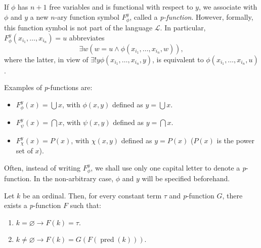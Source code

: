 \begin{definition}
    \label{def:pFunc}
    \leanok
    If $\phi$ has $n+1$ free variables and is functional with respect to $y$, 
    we associate with $\phi$ and $y$ a new $n$-ary function symbol $F_\phi^y$, 
    called a \textit{p-function}. 
    However, formally, this function symbol is not part of the language $\mathcal{L}$. 
    In particular, $F_\phi^y(x_{i_1},\ldots,x_{i_n})=u$ abbreviates
    $$
    \exists w (w = u \land \phi (x_{i_1},\ldots,x_{i_n},w)),
    $$
    where the latter, in view of $\exists! y \phi (x_{i_1},\ldots,x_{i_n},y)$, 
    is equivalent to $\phi (x_{i_1},\ldots,x_{i_n},u)$.

    Examples of \textit{p}-functions are:
    \begin{itemize}
        \item $F_\phi^y(x) = \bigcup x$, with $\phi(x,y)$ defined as $y = \bigcup x$.
        \item $F_\psi^y(x) = \bigcap x$, with $\psi(x,y)$ defined as $y = \bigcap x$.
        \item $F_\chi^y(x) = P (x)$, with $\chi(x,y)$ defined as $y = P (x)$
        ($P(x)$ is the power set of $x$).
    \end{itemize}

    Often, instead of writing $F_\phi^y$, we shall use only one capital letter to 
    denote a \textit{p}-function. 
    In the non-arbitrary case, $\phi$ and $y$ will be specified beforehand.
\end{definition}

\begin{theorem}
    \label{thm:Ord.exists_pFuncRecursive}
    Let $k$ be an ordinal. Then, for every constant term $\tau$ and \textit{p}-function $G$,
    there exists a \textit{p}-function $F$ such that:
    \begin{enumerate}
        \item $k=\varnothing \rightarrow F(k) = \tau$.
        \item $k\neq \varnothing \rightarrow F(k) = G(F(\operatorname{pred}(k)))$.
    \end{enumerate}
\end{theorem}

